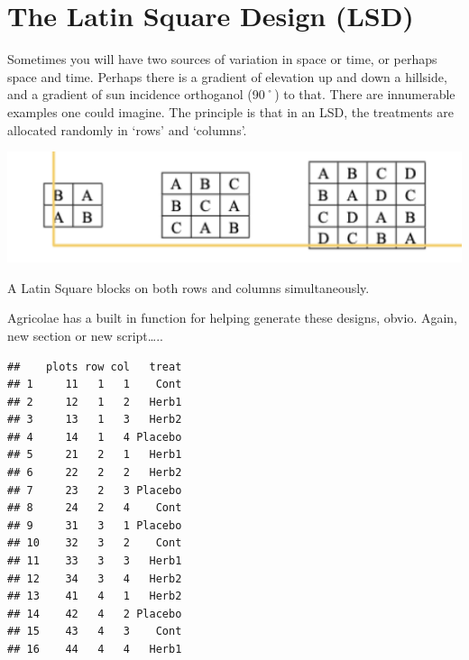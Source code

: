 \documentclass[
]{book}
\newenvironment{Shaded}{\begin{snugshade}}{\end{snugshade}}
\newcommand{\AttributeTok}[1]{\textcolor[rgb]{0.77,0.63,0.00}{#1}}
\newcommand{\CommentTok}[1]{\textcolor[rgb]{0.56,0.35,0.01}{\textit{#1}}}
\newcommand{\DecValTok}[1]{\textcolor[rgb]{0.00,0.00,0.81}{#1}}
\newcommand{\FunctionTok}[1]{\textcolor[rgb]{0.00,0.00,0.00}{#1}}
\newcommand{\NormalTok}[1]{#1}
\newcommand{\OtherTok}[1]{\textcolor[rgb]{0.56,0.35,0.01}{#1}}
\newcommand{\SpecialCharTok}[1]{\textcolor[rgb]{0.00,0.00,0.00}{#1}}
\newcommand{\StringTok}[1]{\textcolor[rgb]{0.31,0.60,0.02}{#1}}
\begin{document}
\hypertarget{the-latin-square-design-lsd}{%
\chapter{The Latin Square Design (LSD)}\label{the-latin-square-design-lsd}}

Sometimes you will have two sources of variation in space or time, or perhaps space and time. Perhaps there is a gradient of elevation up and down a hillside, and a gradient of sun incidence orthoganol (90˚) to that. There are innumerable examples one could imagine. The principle is that in an LSD, the treatments are allocated randomly in `rows' and `columns'.

\includegraphics[width=16.22in]{images/lsd}

A Latin Square blocks on both rows and columns simultaneously.

Agricolae has a built in function for helping generate these designs, obvio. Again, new section or new script\ldots..

\begin{Shaded}
\end{Shaded}

\begin{verbatim}
##    plots row col   treat
## 1     11   1   1    Cont
## 2     12   1   2   Herb1
## 3     13   1   3   Herb2
## 4     14   1   4 Placebo
## 5     21   2   1   Herb1
## 6     22   2   2   Herb2
## 7     23   2   3 Placebo
## 8     24   2   4    Cont
## 9     31   3   1 Placebo
## 10    32   3   2    Cont
## 11    33   3   3   Herb1
## 12    34   3   4   Herb2
## 13    41   4   1   Herb2
## 14    42   4   2 Placebo
## 15    43   4   3    Cont
## 16    44   4   4   Herb1
\end{verbatim}
\end{document}
